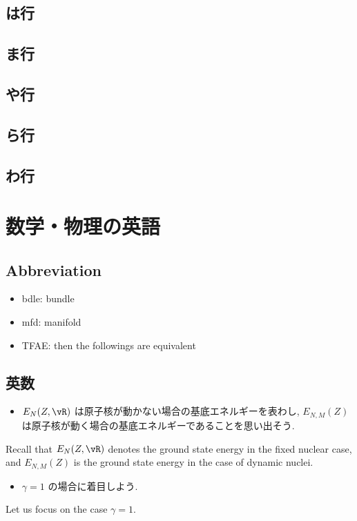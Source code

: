 \documentclass[openany, a4paper, oneside]{jsbook}
\begin{document}
\section{は行}

\section{ま行}

\section{や行}

\section{ら行}

\section{わ行}

\chapter{数学・物理の英語}

\section{Abbreviation}

\begin{itemize}
\item bdle: bundle
\item mfd: manifold
\item TFAE: then the followings are equivalent
\end{itemize}
\section{英数}

\begin{itemize}
\item $E_N(Z, \vR)$ は原子核が動かない場合の基底エネルギーを表わし, $E_{N, M}(Z)$ は原子核が動く場合の基底エネルギーであることを思い出そう. \cite{LiebSeiringer1}
\end{itemize}
Recall that $E_N(Z, \vR)$ denotes the ground state energy in the fixed nuclear case,
and $E_{N, M}(Z)$ is the ground state energy in the case of dynamic nuclei.

\begin{itemize}
\item $\gamma = 1$ の場合に着目しよう. \cite{LiebSeiringer1}
\end{itemize}
Let us focus on the case $\gamma = 1$.
\end{document}
